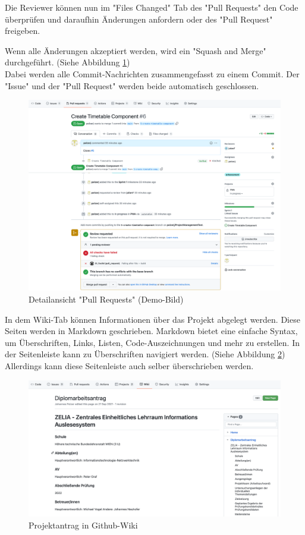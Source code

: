 Die Reviewer können nun im "Files Changed" Tab des "Pull Requests" den Code überprüfen und daraufhin Änderungen anfordern oder des "Pull Request" freigeben. 


Wenn alle Änderungen akzeptiert werden, wird ein "Squash and Merge" durchgeführt. (Siehe Abbildung \ref{fig:pullInfo}) \\ Dabei werden alle Commit-Nachrichten zusammengefasst zu einem Commit. Der "Issue" und der "Pull Request" werden beide automatisch geschlossen.
\cite{GithubFS}

\begin{figure}[H]
    \centering
    \includegraphics[width=\textwidth]{media/ProjectManagement/PullInfo.png}
    \caption{Detailansicht "Pull Requests" (Demo-Bild)}
    \label{fig:pullInfo}
\end{figure}


In dem Wiki-Tab können Informationen über das Projekt abgelegt werden. Diese Seiten werden in Markdown geschrieben. Markdown bietet eine einfache Syntax, um Überschriften, Links, Listen, Code-Auszeichnungen und mehr zu erstellen. In der Seitenleiste kann zu Überschriften navigiert werden. (Siehe Abbildung \ref{fig:Projektantrag}) Allerdings kann diese Seitenleiste auch selber überschrieben werden.

\begin{figure}[H]
    \centering
    \includegraphics[width=\textwidth]{media/ProjectManagement/Wiki.png}
    \caption{Projektantrag in Github-Wiki}
    \label{fig:Projektantrag}
\end{figure}

